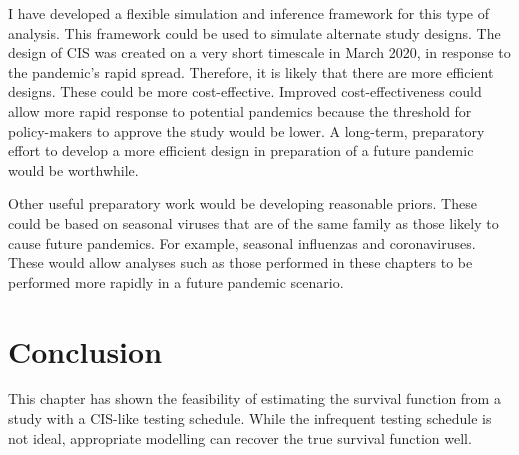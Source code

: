 \documentclass[thesis.tex]{subfiles}
\begin{document}
I have developed a flexible simulation and inference framework for this type of analysis.
This framework could be used to simulate alternate study designs.
The design of CIS was created on a very short timescale in March 2020, in response to the pandemic's rapid spread.
Therefore, it is likely that there are more efficient designs.
These could be more cost-effective.
Improved cost-effectiveness could allow more rapid response to potential pandemics because the threshold for policy-makers to approve the study would be lower.
A long-term, preparatory effort to develop a more efficient design in preparation of a future pandemic would be worthwhile.

Other useful preparatory work would be developing reasonable priors.
These could be based on seasonal viruses that are of the same family as those likely to cause future pandemics.
For example, seasonal influenzas and coronaviruses.
These would allow analyses such as those performed in these chapters to be performed more rapidly in a future pandemic scenario.

\section{Conclusion} \label{perf-test:sec:conclusion}
This chapter has shown the feasibility of estimating the survival function from a study with a CIS-like testing schedule.
While the infrequent testing schedule is not ideal, appropriate modelling can recover the true survival function well.

\ifSubfilesClassLoaded{
  \listoftodos
}{}
\end{document}
